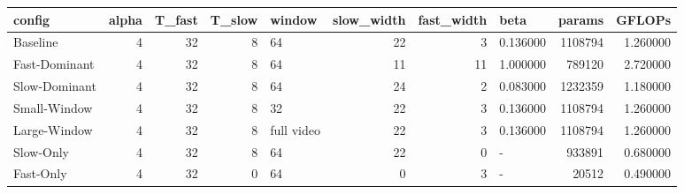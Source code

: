 \begin{tabular}{lrrrlrrlrr}
\toprule
config & alpha & T_fast & T_slow & window & slow_width & fast_width & beta & params & GFLOPs \\
\midrule
Baseline & 4 & 32 & 8 & 64 & 22 & 3 & 0.136000 & 1108794 & 1.260000 \\
Fast-Dominant & 4 & 32 & 8 & 64 & 11 & 11 & 1.000000 & 789120 & 2.720000 \\
Slow-Dominant & 4 & 32 & 8 & 64 & 24 & 2 & 0.083000 & 1232359 & 1.180000 \\
Small-Window & 4 & 32 & 8 & 32 & 22 & 3 & 0.136000 & 1108794 & 1.260000 \\
Large-Window & 4 & 32 & 8 & full video & 22 & 3 & 0.136000 & 1108794 & 1.260000 \\
Slow-Only & 4 & 32 & 8 & 64 & 22 & 0 & - & 933891 & 0.680000 \\
Fast-Only & 4 & 32 & 0 & 64 & 0 & 3 & - & 20512 & 0.490000 \\
\bottomrule
\end{tabular}
